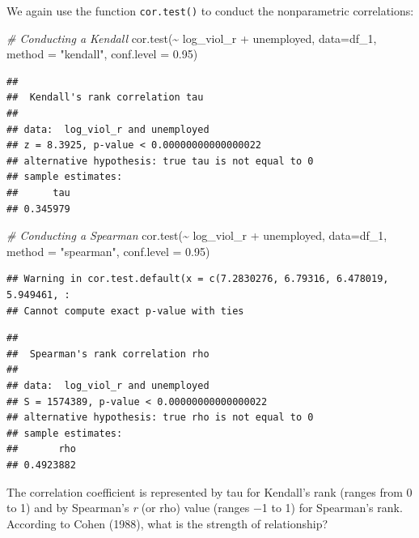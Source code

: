 \documentclass[
]{book}
\newenvironment{Shaded}{\begin{snugshade}}{\end{snugshade}}
\newcommand{\AttributeTok}[1]{\textcolor[rgb]{0.77,0.63,0.00}{#1}}
\newcommand{\CommentTok}[1]{\textcolor[rgb]{0.56,0.35,0.01}{\textit{#1}}}
\newcommand{\FloatTok}[1]{\textcolor[rgb]{0.00,0.00,0.81}{#1}}
\newcommand{\FunctionTok}[1]{\textcolor[rgb]{0.00,0.00,0.00}{#1}}
\newcommand{\NormalTok}[1]{#1}
\newcommand{\SpecialCharTok}[1]{\textcolor[rgb]{0.00,0.00,0.00}{#1}}
\newcommand{\StringTok}[1]{\textcolor[rgb]{0.31,0.60,0.02}{#1}}
\begin{document}
We again use the function \texttt{cor.test()} to conduct the nonparametric correlations:

\begin{Shaded}
\begin{Highlighting}[]
\CommentTok{\# Conducting a Kendall}
\FunctionTok{cor.test}\NormalTok{(}\SpecialCharTok{\textasciitilde{}}\NormalTok{ log\_viol\_r }\SpecialCharTok{+}\NormalTok{ unemployed, }\AttributeTok{data=}\NormalTok{df\_1, }\AttributeTok{method =} \StringTok{"kendall"}\NormalTok{, }\AttributeTok{conf.level =} \FloatTok{0.95}\NormalTok{)}
\end{Highlighting}
\end{Shaded}

\begin{verbatim}
## 
##  Kendall's rank correlation tau
## 
## data:  log_viol_r and unemployed
## z = 8.3925, p-value < 0.00000000000000022
## alternative hypothesis: true tau is not equal to 0
## sample estimates:
##      tau 
## 0.345979
\end{verbatim}

\begin{Shaded}
\begin{Highlighting}[]
\CommentTok{\# Conducting a Spearman}
\FunctionTok{cor.test}\NormalTok{(}\SpecialCharTok{\textasciitilde{}}\NormalTok{ log\_viol\_r }\SpecialCharTok{+}\NormalTok{ unemployed, }\AttributeTok{data=}\NormalTok{df\_1, }\AttributeTok{method =} \StringTok{"spearman"}\NormalTok{, }\AttributeTok{conf.level =} \FloatTok{0.95}\NormalTok{)}
\end{Highlighting}
\end{Shaded}

\begin{verbatim}
## Warning in cor.test.default(x = c(7.2830276, 6.79316, 6.478019, 5.949461, :
## Cannot compute exact p-value with ties
\end{verbatim}

\begin{verbatim}
## 
##  Spearman's rank correlation rho
## 
## data:  log_viol_r and unemployed
## S = 1574389, p-value < 0.00000000000000022
## alternative hypothesis: true rho is not equal to 0
## sample estimates:
##       rho 
## 0.4923882
\end{verbatim}

The correlation coefficient is represented by tau for Kendall's rank (ranges from 0 to 1) and by Spearman's \emph{r} (or rho) value (ranges −1 to 1) for Spearman's rank. According to Cohen (1988), what is the strength of relationship?
\end{document}
